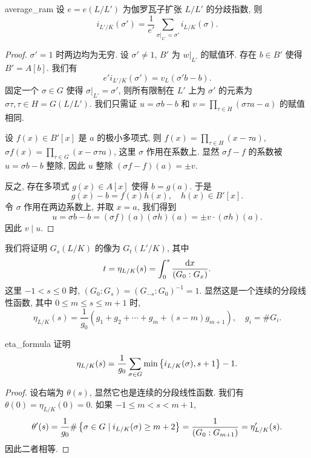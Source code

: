 \begin{proposition}{}{average_ram}
设 $e=e(L/L')$ 为伽罗瓦子扩张 $L/L'$ 的分歧指数, 则
  \[i_{L'/K}(\sigma')=\frac{1}{e'}\sum_{\sigma|_{L'}=\sigma'} i_{L/K}(\sigma).\]
\end{proposition}
\begin{proof}
$\sigma'=1$ 时两边均为无穷. 设 $\sigma'\neq 1$, $B'$ 为 $w|_{L'}$ 的赋值环. 存在 $b\in B'$ 使得 $B'=A[b]$. 我们有
  \[e' i_{L'/K}(\sigma')=v_L(\sigma' b-b).\]
固定一个 $\sigma\in G$ 使得 $\sigma|_{L'}=\sigma'$, 则所有限制在 $L'$ 上为 $\sigma'$ 的元素为 $\sigma\tau,\tau\in H=G(L/L')$. 我们只需证 $u=\sigma b-b$ 和 $v=\prod_{\tau\in H}(\sigma\tau a-a)$ 的赋值相同.

设 $f(x)\in B'[x]$ 是 $a$ 的极小多项式, 则 $f(x)=\prod_{\tau\in H}(x-\tau a)$, $\sigma f(x)=\prod_{\tau\in G}(x-\sigma\tau a)$, 这里 $\sigma$ 作用在系数上. 显然 $\sigma f-f$ 的系数被 $u=\sigma b-b$ 整除, 因此 $u$ 整除 $(\sigma f-f)(a)=\pm v$.

反之, 存在多项式 $g(x)\in A[x]$ 使得 $b=g(a)$. 于是
  \[g(x)-b=f(x)h(x),\quad h(x)\in B'[x].\]
令 $\sigma$ 作用在两边系数上, 并取 $x=a$, 我们得到
  \[u=\sigma b-b=(\sigma f)(a) (\sigma h)(a)=\pm v \cdot(\sigma h)(a).\]
因此 $v\mid u$.
\end{proof}

我们将证明 $G_s(L/K)$ 的像为 $G_t(L'/K)$, 其中
  \[t=\eta_{L/K}(s)=\int_0^s \frac{\mathop{}\!\mathrm{d} x}{(G_0:G_x)}.\]
这里 $-1<s\le 0$ 时, $(G_0:G_s)=(G_{-s}:G_0)^{-1}=1$. 显然这是一个连续的分段线性函数, 其中 $0\le m\le s\le m+1$ 时, 
  \[\eta_{L/K}(s)=\frac{1}{g_0}(g_1+g_2+\cdots+g_m+(s-m)g_{m+1}),\quad g_i=\# G_i.\]

\begin{proposition}{}{eta_formula}
证明
  \[\eta_{L/K}(s)=\frac{1}{g_0}\sum_{\sigma \in G}\min\left\{i_{L/K}(\sigma),s+1\right\}-1.\]
\end{proposition}
\begin{proof}
设右端为 $\theta(s)$, 显然它也是连续的分段线性函数. 我们有 $\theta(0)=\eta_{L/K}(0)=0$. 如果 $-1\le m<s<m+1$,
  \[\theta'(s)=\frac{1}{g_0}\#\left\{\sigma \in G\mid i_{L/K}(\sigma)\ge m+2\right\}=\frac{1}{(G_0:G_{m+1})}=\eta_{L/K}'(s).\]
因此二者相等.
\end{proof}


